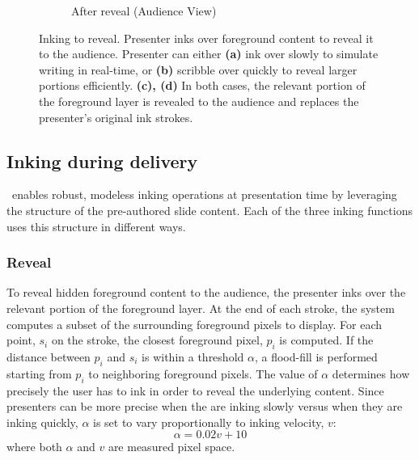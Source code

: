 \begin{figure}[t!]
\begin{subfigure}[t]{0.5\columnwidth}
        \caption{After reveal (Audience View)}
    \end{subfigure}
    \caption{Inking to reveal. Presenter inks over foreground content to reveal it to the audience. Presenter can either \textbf{(a)} ink over slowly to simulate writing in real-time, or \textbf{(b)} scribble over quickly to reveal larger portions efficiently. \textbf{(c), (d)} In both cases, the relevant portion of the foreground layer is revealed to the audience and replaces the presenter's original ink strokes.}
    \label{fig:inkreveal}
\end{figure}

\subsection{Inking during delivery}
%
\interface\ enables robust, modeless inking operations at presentation time by leveraging the structure of the pre-authored slide content. Each of the three inking functions uses this structure in different ways. 
\subsubsection{Reveal}
To reveal hidden foreground content to the audience, the presenter inks over the relevant portion of the foreground layer.
%
At the end of each stroke, the system computes a subset of the surrounding foreground pixels to display. 
%
For each point, $s_i$ on the stroke, the closest foreground pixel, $p_i$ is computed. If the distance between $p_i$ and $s_i$ is within a threshold $\alpha$, a flood-fill is performed starting from $p_i$ to neighboring foreground pixels. The value of $\alpha$ determines how precisely the user has to ink in order to reveal the underlying content. Since presenters can be more precise when the are inking slowly versus when they are inking quickly, $\alpha$ is set to vary proportionally to inking velocity, $v$:
%
\begin{equation}
\alpha = 0.02v+10
\end{equation}
where both $\alpha$ and $v$ are measured pixel space.
 
